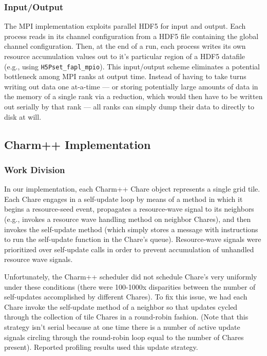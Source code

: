 \subsubsection{Input/Output}

The MPI implementation exploits parallel HDF5 for input and output.
Each process reads in its channel configuration from a HDF5 file containing the global channel configuration.
Then, at the end of a run, each process writes its own resource accumulation values out to it's particular region of a HDF5 datafile (e.g., using \texttt{H5Pset_fapl_mpio}).
This input/output scheme eliminates a potential bottleneck among MPI ranks at output time.
Instead of having to take turns writing out data one at-a-time --- or storing potentially large amounts of data in the memory of a single rank via a reduction, which would then have to be written out serially by that rank --- all ranks can simply dump their data to directly to disk at will.

\subsection{Charm++ Implementation}

\subsubsection{Work Division}

In our implementation, each Charm++ Chare object represents a single grid tile.
Each Chare engages in a self-update loop by means of a method in which it begins a resource-seed event, propagates a resource-wave signal to its neighbors (e.g., invokes a resource wave handling method on neighbor Chares), and then invokes the self-update method (which simply stores a message with instructions to run the self-update function in the Chare's queue).
Resource-wave signals were prioritized over self-update calls in order to prevent accumulation of unhandled resource wave signals.

Unfortunately, the Charm++ scheduler did not schedule Chare's very uniformly under these conditions (there were 100-1000x disparities between the number of self-updates accomplished by different Chares).
To fix this issue, we had each Chare invoke the self-update method of a neighbor so that updates cycled through the collection of tile Chares in a round-robin fashion.
(Note that this strategy isn't serial because at one time there is a number of active update signals circling through the round-robin loop equal to the number of Chares present).
Reported profiling results used this update strategy.

